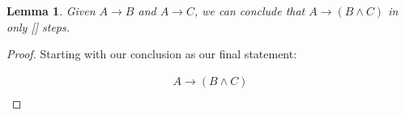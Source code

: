 \documentclass{article}
\newtheorem{lem}{Lemma}
\begin{document}
\begin{lem}
	Given $A \rightarrow B$ and $A \rightarrow C$, we can conclude that $A \rightarrow (B \land C)$ in only [] steps.
\end{lem}
\begin{proof}
	Starting with our conclusion as our final statement:

	\begin{gather*}
	A \rightarrow (B \land C) \tag*{$(\alpha)$} \\
	\end{gather*}
	
	

\end{proof}
\end{document}
